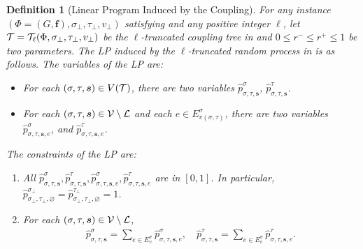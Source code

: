 \documentclass[11pt]{article}
\newtheorem{definition}[theorem]{Definition}
\newcommand{\vecf}{\boldsymbol{f}}
\newcommand{\seqS}{\boldsymbol{s}}
\begin{document}

\begin{definition}[Linear Program Induced by the Coupling] \label{def:induced-LP}
    For any instance $\left(\Phi = (G, \vecf),  \sigma_\bot, \tau_\bot,v_{\bot}\right)$ satisfying  and  any positive integer $\ell$, 
    let $\mathcal{T} = \mathcal{T}_{\ell}(\Phi, \sigma_\bot, \tau_\bot, v_\bot)$ be the $\ell$-truncated coupling tree in  and $0 \leq r^- \leq r^+\leq 1$ be two parameters.
    The LP induced by the $\ell$-truncated random process in  is as follows.
    The variables of the LP are:
    \begin{itemize}
    \item For each $(\sigma, \tau, \seqS) \in V(\+T)$, there are two variables $\widehat{p}_{\sigma, \tau, \seqS}^{\sigma}$, $\widehat{p}_{\sigma,\tau, \seqS}^{\tau}$.
    \item For each $(\sigma,\tau,\seqS)\in \+V\setminus \+L$ and each $e\in E_{v(\sigma,\tau)}^{\sigma}$, there are two variables $\widehat{p}_{\sigma,\tau,\seqS,e}^{\sigma}$, and $\widehat{p}_{\sigma,\tau,\seqS,e}^{\tau}$.
    \end{itemize}
    The constraints of the LP are:
    \begin{enumerate}
        \item All $\widehat{p}^{\sigma}_{\sigma, \tau, \seqS}, \widehat{p}^{\tau}_{\sigma, \tau, \seqS},\widehat{p}^{\sigma}_{\sigma, \tau, \seqS,e}, \widehat{p}^{\tau}_{\sigma, \tau, \seqS,e}$ are in $[0, 1]$. In particular, $\widehat{p}^{\sigma_\bot}_{\sigma_\bot,\tau_\bot, \varnothing}=\widehat{p}^{\tau_\bot}_{\sigma_\bot,\tau_\bot,\varnothing} = 1$.\label{item-first-LP}
        \item For each $(\sigma, \tau, \seqS)\in \+V\setminus\+L$, 
            \begin{align}\label{eqn-hat-inter-sum1}
               \widehat{p}^{\sigma}_{\sigma, \tau, \seqS} = \sum_{e \in  E_v^{\sigma}} \widehat{p}^{\sigma}_{\sigma, \tau, \seqS, e}, \quad  \widehat{p}^{\tau}_{\sigma,\tau, \seqS}=\sum_{e\in  E_v^{\sigma}} \widehat{p}^{\tau}_{\sigma,\tau, \seqS,e}.
            \end{align}\label{item-second-LP}

\end{enumerate}
\end{definition}
\end{document}
